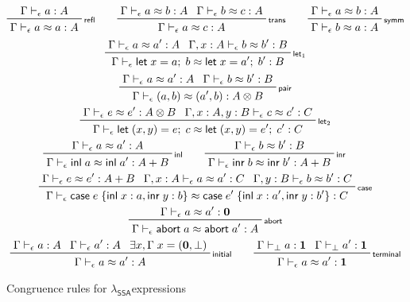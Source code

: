 \documentclass[acmsmall,screen,review]{acmart}
\newcommand{\mb}[1]{\ensuremath{\mathbf{#1}}}
\newcommand{\ms}[1]{\ensuremath{\mathsf{#1}}}
\newcommand{\lto}{:}
\newcommand{\linl}[1]{\ms{inl}\;{#1}}
\newcommand{\linr}[1]{\ms{inr}\;{#1}}
\newcommand{\labort}[1]{\ms{abort}\;{#1}}
\newcommand{\letexpr}[3]{\ensuremath{\ms{let}\;#1 = #2;\;#3}}
\newcommand{\caseexpr}[5]{\ms{case}\;#1\;\{\linl{#2} \lto #3, \linr{#4} \lto #5\}}
\newcommand{\bhyp}[2]{#1 : #2}
\newcommand{\rle}[1]{{\scriptsize\textsf{#1}}}
\newcommand{\hasty}[4]{#1 \vdash_{#2} #3: {#4}}
\newcommand{\teqv}{\approx}
\newcommand{\tmeq}[5]{#1 \vdash_{#2} #3 \teqv #4 : {#5}}
\newcommand{\isotopessa}{\(\lambda_{\ms{SSA}}\)}
\begin{document}
\begin{figure}
  \begin{gather*}
    \prftree[r]{\rle{refl}}{\hasty{\Gamma}{\epsilon}{a}{A}}{\tmeq{\Gamma}{\epsilon}{a}{a}{A}} \qquad
    \prftree[r]{\rle{trans}}
      {\tmeq{\Gamma}{\epsilon}{a}{b}{A}}
      {\tmeq{\Gamma}{\epsilon}{b}{c}{A}} 
      {\tmeq{\Gamma}{\epsilon}{a}{c}{A}} \qquad
    \prftree[r]{\rle{symm}}
      {\tmeq{\Gamma}{\epsilon}{a}{b}{A}}
      {\tmeq{\Gamma}{\epsilon}{b}{a}{A}}
    \\
    \prftree[r]{\rle{let$_1$}}
      {\tmeq{\Gamma}{\epsilon}{a}{a'}{A}}
      {\tmeq{\Gamma, \bhyp{x}{A}}{\epsilon}{b}{b'}{B}}
      {\tmeq{\Gamma}{\epsilon}{\letexpr{x}{a}{b}}{\letexpr{x}{a'}{b'}}{B}} 
    \\
    \prftree[r]{\rle{pair}}
      {\tmeq{\Gamma}{\epsilon}{a}{a'}{A}}
      {\tmeq{\Gamma}{\epsilon}{b}{b'}{B}}
      {\tmeq{\Gamma}{\epsilon}{(a, b)}{(a', b)}{A \otimes B}}
    \\
    \prftree[r]{\rle{let$_2$}}
      {\tmeq{\Gamma}{\epsilon}{e}{e'}{A \otimes B}}
      {\tmeq{\Gamma, \bhyp{x}{A}, \bhyp{y}{B}}{\epsilon}{c}{c'}{C}}
      {\tmeq{\Gamma}{\epsilon}{\letexpr{(x, y)}{e}{c}}{\letexpr{(x, y)}{e'}{c'}}{C}}
    \\
    \prftree[r]{\rle{inl}}
      {\tmeq{\Gamma}{\epsilon}{a}{a'}{A}}
      {\tmeq{\Gamma}{\epsilon}{\linl{a}}{\linl{a'}}{A + B}} \qquad
    \prftree[r]{\rle{inr}}
      {\tmeq{\Gamma}{\epsilon}{b}{b'}{B}}
      {\tmeq{\Gamma}{\epsilon}{\linr{b}}{\linr{b'}}{A + B}} \qquad
    \\
    \prftree[r]{\rle{case}}
      {\tmeq{\Gamma}{\epsilon}{e}{e'}{A + B}}
      {\tmeq{\Gamma, \bhyp{x}{A}}{\epsilon}{a}{a'}{C}}
      {\tmeq{\Gamma, \bhyp{y}{B}}{\epsilon}{b}{b'}{C}}
      {\tmeq{\Gamma}{\epsilon}{\caseexpr{e}{x}{a}{y}{b}}{\caseexpr{e'}{x}{a'}{y}{b'}}{C}}
    \\
    \prftree[r]{\rle{abort}}
      {\tmeq{\Gamma}{\epsilon}{a}{a'}{\mb{0}}}
      {\tmeq{\Gamma}{\epsilon}{\labort{a}}{\labort{a'}}{A}}
    \\
    \prftree[r]{\rle{initial}} 
      {\hasty{\Gamma}{\epsilon}{a}{A}}
      {\hasty{\Gamma}{\epsilon}{a'}{A}}
      {\exists x, \Gamma\;x = (\mb{0}, \bot)}
      {\tmeq{\Gamma}{\epsilon}{a}{a'}{A}}
      \qquad
    \prftree[r]{\rle{terminal}}
      {\hasty{\Gamma}{\bot}{a}{\mb{1}}}
      {\hasty{\Gamma}{\bot}{a'}{\mb{1}}}
      {\tmeq{\Gamma}{\epsilon}{a}{a'}{\mb{1}}}
  \end{gather*}
  \caption{Congruence rules for \isotopessa expressions}
  \Description{}
  \label{fig:ssa-expr-congr-rules}
\end{figure}
\end{document}
